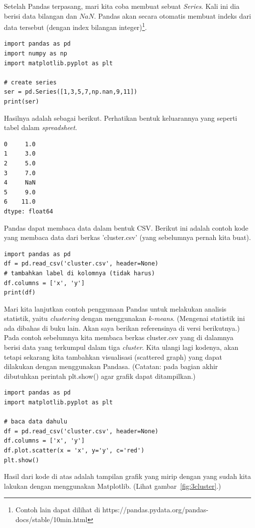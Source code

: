 Setelah Pandas terpasang, mari kita coba membuat sebuat {\em Series}.
Kali ini dia berisi data bilangan dan $NaN$.
Pandas akan secara otomatis membuat indeks dari data tersebut (dengan
index bilangan integer)\footnote{Contoh lain dapat dilihat di
https://pandas.pydata.org/pandas-docs/stable/10min.html}.

\begin{verbatim}
import pandas as pd
import numpy as np
import matplotlib.pyplot as plt

# create series
ser = pd.Series([1,3,5,7,np.nan,9,11])
print(ser)
\end{verbatim}

Hasilnya adalah sebagai berikut. Perhatikan bentuk keluarannya
yang seperti tabel dalam {\em spreadsheet}.
\begin{verbatim}
0     1.0
1     3.0
2     5.0
3     7.0
4     NaN
5     9.0
6    11.0
dtype: float64
\end{verbatim}

Pandas dapat membaca data dalam bentuk CSV.
Berikut ini adalah contoh kode yang membaca data dari berkas 'cluster.csv'
(yang sebelumnya pernah kita buat).

\begin{verbatim}
import pandas as pd
df = pd.read_csv('cluster.csv', header=None)
# tambahkan label di kolomnya (tidak harus)
df.columns = ['x', 'y']
print(df)
\end{verbatim}


Mari kita lanjutkan contoh penggunaan Pandas untuk melakukan analisis
statistik, yaitu {\em clustering} dengan menggunakan {\em k-means}.
(Mengenai statistik ini ada dibahas di buku lain.
Akan saya berikan referensinya di versi berikutnya.)
Pada contoh sebelumnya kita membaca berkas cluster.csv yang di dalamnya
berisi data yang terkumpul dalam tiga {\em cluster}.
Kita ulangi lagi kodenya, akan tetapi sekarang kita tambahkan visualisasi
(scattered graph) yang dapat dilakukan dengan menggunakan Pandasa.
(Catatan: pada bagian akhir dibutuhkan perintah plt.show() agar grafik
dapat ditampilkan.)

\begin{verbatim}
import pandas as pd
import matplotlib.pyplot as plt
   
# baca data dahulu
df = pd.read_csv('cluster.csv', header=None)
df.columns = ['x', 'y']
df.plot.scatter(x = 'x', y='y', c='red')
plt.show()
\end{verbatim}

Hasil dari kode di atas adalah tampilan grafik yang mirip dengan
yang sudah kita lakukan dengan menggunakan Matplotlib.
(Lihat gambar~\ref{fig:3cluster}.)

